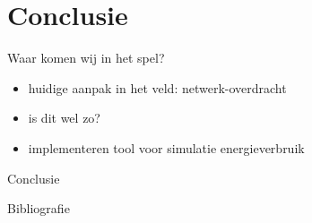 \documentclass[presentation, bigger]{beamer}
\begin{document}
\section{Conclusie}
\label{sec-4}
\begin{frame}[label=sec-4-1]{Waar komen wij in het spel?}
\begin{itemize}
\item huidige aanpak in het veld: netwerk-overdracht
\item is dit wel zo?
\item implementeren tool voor simulatie energieverbruik
\end{itemize}
\end{frame}

\begin{frame}[label=sec-4-2]{Conclusie}
\end{frame}
\begin{frame}[allowframebreaks]{Bibliografie}
\nocite{*}
\printbibliography
\end{frame}

\end{document}

